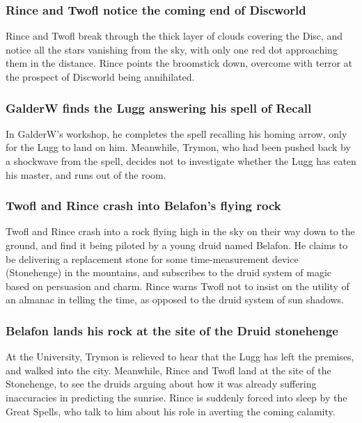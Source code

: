 \subsubsection{\Gls{Rince} and \Gls{Twofl} notice the coming end of Discworld}
\Gls{Rince} and \Gls{Twofl} break through the thick layer of clouds covering the Disc, and notice
all the stars vanishing from the sky, with only one red dot approaching them in the distance.
\Gls{Rince} points the broomstick down, overcome with terror at the prospect of Discworld being
annihilated.

\subsubsection{\Gls{GalderW} finds the \Gls{Lugg} answering his spell of Recall}
In \Gls{GalderW}'s workshop, he completes the spell recalling his homing arrow, only for the
\Gls{Lugg} to land on him. Meanwhile, \Gls{Trymon}, who had been pushed back by a shockwave from
the spell, decides not to investigate whether the \Gls{Lugg} has eaten his master, and runs out of
the room.

\subsubsection{\Gls{Twofl} and \Gls{Rince} crash into \Gls{Belafon}'s flying rock}
\Gls{Twofl} and \Gls{Rince} crash into a rock flying high in the sky on their way down to the
ground, and find it being piloted by a young druid named \Gls{Belafon}. He claims to be delivering
a replacement stone for some time-measurement device (Stonehenge) in the mountains, and subscribes
to the druid system of magic based on persuasion and charm. \Gls{Rince} warns \Gls{Twofl} not to
insist on the utility of an almanac in telling the time, as opposed to the druid system of sun
shadows.

\subsubsection{\Gls{Belafon} lands his rock at the site of the Druid stonehenge}
At the University, \Gls{Trymon} is relieved to hear that the \Gls{Lugg} has left the premises, and
walked into the city. Meanwhile, \Gls{Rince} and \Gls{Twofl} land at the site of the Stonehenge,
to see the druids arguing about how it was already suffering inaccuracies in predicting the
sunrise. \Gls{Rince} is suddenly forced into sleep by the Great Spells, who talk to him about his
role in averting the coming calamity.


